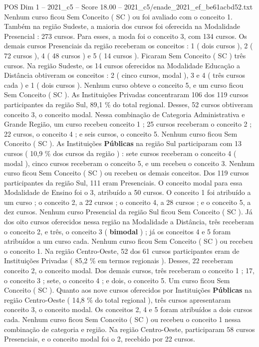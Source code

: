 \begin{textsample}{POS Dim 1 – 2021\_c5 – Score 18.00 – 2021\_c5/enade\_2021\_ef\_be61acbd52.txt}
Nenhum curso ficou Sem Conceito ( SC ) ou foi avaliado com o conceito 1.
Também na região Sudeste, a maioria dos cursos foi oferecida na Modalidade Presencial : 273 cursos.
Para esses, a moda foi o conceito 3, com 134 cursos.
Os demais cursos Presenciais da região receberam os conceitos : 1 ( dois cursos ), 2 ( 72 cursos ), 4 ( 48 cursos ) e 5 ( 14 cursos ).
Ficaram Sem Conceito ( SC ) três cursos.
Na região Sudeste, os 14 cursos oferecidos na Modalidade Educação a Distância obtiveram os conceitos : 2 ( cinco cursos, modal ), 3 e 4 ( três cursos cada ) e 1 ( dois cursos ).
Nenhum curso obteve o conceito 5, e um curso ficou Sem Conceito ( SC ).
As Instituições Privadas concentraram 106 dos 119 cursos participantes da região Sul, 89,1 \% do total regional.
Desses, 52 cursos obtiveram conceito 3, o conceito modal.
Nessa combinação de Categoria Administrativa e Grande Região, um curso recebeu conceito 1 ; 25 cursos receberam o conceito 2 ; 22 cursos, o conceito 4 ; e seis cursos, o conceito 5.
Nenhum curso ficou Sem Conceito ( SC ).
As Instituições \textbf{Públicas} na região Sul participaram com 13 cursos ( 10,9 \% dos cursos da região ) : sete cursos receberam o conceito 4 ( modal ), cinco cursos receberam o conceito 5, e um recebeu o conceito 3.
Nenhum curso ficou Sem Conceito ( SC ) ou recebeu os demais conceitos.
Dos 119 cursos participantes da região Sul, 111 eram Presenciais.
O conceito modal para essa Modalidade de Ensino foi o 3, atribuído a 50 cursos.
O conceito 1 foi atribuído a um curso ; o conceito 2, a 22 cursos ; o conceito 4, a 28 cursos ; e o conceito 5, a dez cursos.
Nenhum curso Presencial da região Sul ficou Sem Conceito ( SC ).
Já dos oito cursos oferecidos nessa região na Modalidade a Distância, três receberam o conceito 2, e três, o conceito 3 ( \textbf{bimodal} ) ; já os conceitos 4 e 5 foram atribuídos a um curso cada.
Nenhum curso ficou Sem Conceito ( SC ) ou recebeu o conceito 1.
Na região Centro-Oeste, 52 dos 61 cursos participantes eram de Instituições Privadas ( 85,2 \% em termos regionais ).
Desses, 22 receberam conceito 2, o conceito modal.
Dos demais cursos, três receberam o conceito 1 ; 17, o conceito 3 ; sete, o conceito 4 ; e dois, o conceito 5.
Um curso ficou Sem Conceito ( SC ).
Quanto aos nove cursos oferecidos por Instituições \textbf{Públicas} na região Centro-Oeste ( 14,8 \% do total regional ), três cursos apresentaram conceito 3, o conceito modal.
Os conceitos 2, 4 e 5 foram atribuídos a dois cursos cada.
Nenhum curso ficou Sem Conceito ( SC ) ou recebeu o conceito 1 nessa combinação de categoria e região.
Na região Centro-Oeste, participaram 58 cursos Presenciais, e o conceito modal foi o 2, recebido por 22 cursos.

\end{textsample}
